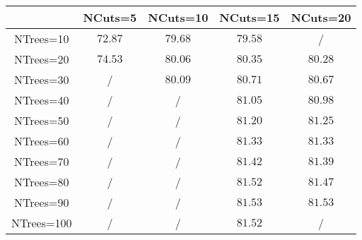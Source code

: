 \centering
\begin{tabular}{|c|c|c|c|c|} \hline
 & NCuts=5 & NCuts=10 & NCuts=15 & NCuts=20\\\hline
NTrees=10 & $72.87$ & $79.68$ & $79.58$ &  /\\\hline
NTrees=20 & $74.53$ & $80.06$ & $80.35$ & $80.28$\\\hline
NTrees=30 &  / & $80.09$ & $80.71$ & $80.67$\\\hline
NTrees=40 &  / &  / & $81.05$ & $80.98$\\\hline
NTrees=50 &  / &  / & $81.20$ & $81.25$\\\hline
NTrees=60 &  / &  / & $81.33$ & $81.33$\\\hline
NTrees=70 &  / &  / & $81.42$ & $81.39$\\\hline
NTrees=80 &  / &  / & $81.52$ & $81.47$\\\hline
NTrees=90 &  / &  / & $81.53$ & $81.53$\\\hline
NTrees=100 &  / &  / & $81.52$ &  /\\\hline
\end{tabular}

